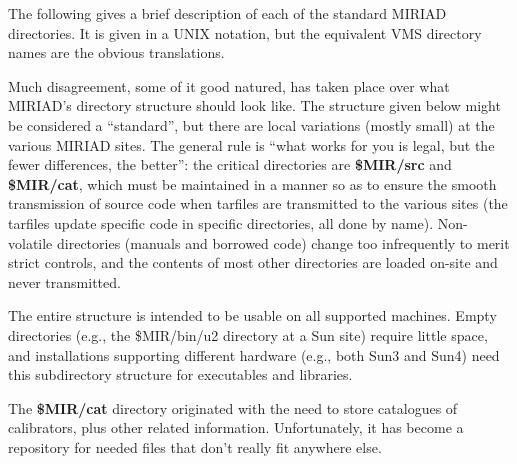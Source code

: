 %
%

The following gives a brief description of each of the standard MIRIAD
directories.  It is given in a UNIX notation, but the equivalent VMS
directory names are the obvious translations.

Much disagreement, some of it good natured, has taken place over what
MIRIAD's directory structure should look like.  The structure given
below might be considered a ``standard'', but there are local variations
(mostly small) at the various MIRIAD sites.  The general rule is
``what works for you is legal, but the fewer differences, the better'':
the critical directories are {\bf \$MIR/src} and {\bf \$MIR/cat}, which
must be maintained in a manner so as to ensure the smooth transmission
of source code when tarfiles are transmitted to the various sites (the
tarfiles update specific code in specific directories, all done by
name).  Non-volatile directories (manuals and borrowed code) change too
infrequently to merit strict controls, and the contents of most other
directories are loaded on-site and never transmitted.

The entire structure is intended to be usable on all supported machines.
Empty directories (e.g., the \$MIR/bin/u2 directory at a Sun site) require
little space, and installations supporting different hardware (e.g., both
Sun3 and Sun4) need this subdirectory structure for executables and 
libraries.

The {\bf \$MIR/cat} directory originated with the need to store catalogues of
calibrators, plus other related information.  Unfortunately, it has become
a repository for needed files that don't really fit anywhere else.


